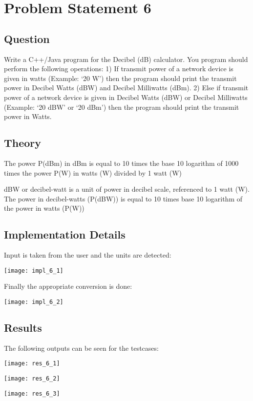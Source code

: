 \documentclass[11pt,a4paper]{article}
\begin{document}
\section{Problem Statement 6}\label{sec:problem6}
\subsection{Question}\label{sec:question6}
Write a C++/Java program for the Decibel (dB) calculator. You program should perform the following operations:
1) If transmit power of a network device is given in watts (Example: ‘20 W’) then the program should print the transmit power in Decibel Watts (dBW) and Decibel Milliwatts (dBm).
2) Else if transmit power of a network device is given in Decibel Watts (dBW) or Decibel Milliwatts (Example: ‘20 dBW’ or ‘20 dBm’) then the program should print the transmit power in Watts.

\subsection{Theory}\label{sec:theory6}
The power P(dBm) in dBm is equal to 10 times the base 10 logarithm of 1000 times the power P(W) in watts (W) divided by 1 watt (W)

dBW or decibel-watt is a unit of power in decibel scale, referenced to 1 watt (W).
The power in decibel-watts (P(dBW)) is equal to 10 times base 10 logarithm of the power in watts (P(W))

\subsection{Implementation Details}\label{sec:details6}
Input is taken from the user and the units are detected:

\texttt{[image: impl\_6\_1]}

\hspace{1 pt}

Finally the appropriate conversion is done:

\texttt{[image: impl\_6\_2]}

\subsection{Results}\label{sec:results6}
The following outputs can be seen for the testcases: 

\texttt{[image: res\_6\_1]}

\texttt{[image: res\_6\_2]}

\texttt{[image: res\_6\_3]}
\end{document}
